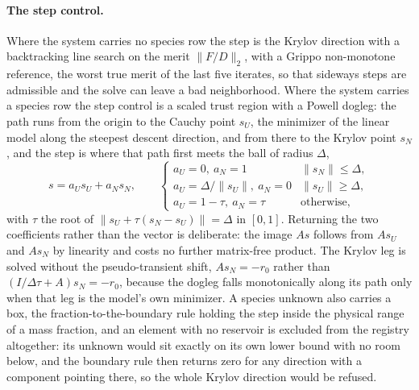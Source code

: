 \paragraph{The step control.}
Where the system carries no species row the step is the Krylov direction with
a backtracking line search on the merit $\|F/D\|_2$, with a Grippo
non-monotone reference, the worst true merit of the last five iterates, so
that sideways steps are admissible and the solve can leave a bad
neighborhood.  Where the system carries a species row the step control is a
scaled trust region with a Powell dogleg: the path runs from the origin to the
Cauchy point $s_U$, the minimizer of the linear model along the steepest
descent direction, and from there to the Krylov point $s_N$, and the step is
where that path first meets the ball of radius $\Delta$,
%
\begin{equation}
  s = a_U s_U + a_N s_N,
  \qquad
  \begin{cases}
    a_U = 0,\ a_N = 1                 & \|s_N\| \le \Delta,\\
    a_U = \Delta/\|s_U\|,\ a_N = 0    & \|s_U\| \ge \Delta,\\
    a_U = 1-\tau,\ a_N = \tau         & \text{otherwise},
  \end{cases}
  \label{eq:dogleg}
\end{equation}
%
with $\tau$ the root of $\|s_U + \tau(s_N - s_U)\| = \Delta$ in $[0,1]$.
Returning the two coefficients rather than the vector is deliberate: the image
$As$ follows from $As_U$ and $As_N$ by linearity and costs no further
matrix-free product.  The Krylov leg is solved without the pseudo-transient
shift, $As_N = -r_0$ rather than $(I/\Delta\tau + A)s_N = -r_0$, because the
dogleg falls monotonically along its path only when that leg is the model's own
minimizer.  A species unknown also carries a box, the fraction-to-the-boundary
rule holding the step inside the physical range of a mass fraction, and an
element with no reservoir is excluded from the registry altogether: its
unknown would sit exactly on its own lower bound with no room below, and the
boundary rule then returns zero for any direction with a component pointing
there, so the whole Krylov direction would be refused.

